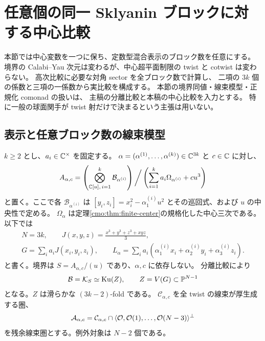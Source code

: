 \section{任意個の同一 Sklyanin ブロックに対する中心比較}
\label{cmm:sec:multiblock-central}

本節では中心変数を一つに保ち、定数型混合表示のブロック数を任意にする。
境界の Calabi--Yau 次元は変わるが、中心超平面制限の twist と cotwist は変わらない。
高次比較に必要な対角 sector を全ブロック数で計算し、
二項の $3k$ 個の係数と三項の一係数から実比較を構成する。
本節の境界同値・線束模型・正規化 comonad の扱いは、
主稿の分離比較と本稿の中心比較を入力とする。
特に一般の球面関手が twist 射だけで決まるという主張は用いない。

\subsection{表示と任意ブロック数の線束模型}

$k\ge2$ とし、$a_i\in\mathbb C^\times$ を固定する。
$\alpha=(\alpha^{(1)},\ldots,\alpha^{(k)})\in\mathbb C^{3k}$ と $c\in\mathbb C$ に対し、
\begin{equation}\label{cmm:eq:family}
 A_{\alpha,c}=
 \left(\bigotimes_{\mathbb C[u],\,i=1}^k\mathcal B_{\alpha^{(i)}}\right)
 \bigg/\left(\sum_{i=1}^k a_i\Omega_{\alpha^{(i)}}+cu^3\right)
\end{equation}
と置く。ここで各 $\mathcal B_{\alpha^{(i)}}$ は
$[y_i,z_i]=x_i^2-\alpha^{(i)}_1u^2$ とその巡回式、および $u$ の中央性で定める。
$\Omega_\alpha$ は定理\ref{cmo:thm:finite-center}の規格化した中心三次である。
以下では
\[
 \begin{gathered}
 N=3k,\qquad
 J(x,y,z)=\frac{x^3+y^3+z^3+xyz}{3},\\
 G=\sum_i a_iJ(x_i,y_i,z_i),\qquad
 L_\alpha=\sum_i a_i(\alpha^{(i)}_1x_i+
                         \alpha^{(i)}_2y_i+\alpha^{(i)}_3z_i).
 \end{gathered}
\]
と書く。境界は $S=A_{\alpha,c}/(u)$ であり、$\alpha,c$ に依存しない。
分離比較により
\[
 \mathcal B=\mathcal K_S\simeq\operatorname{Ku}(Z),\qquad
 Z=V(G)\subset\mathbb P^{N-1}
\]
となる。$Z$ は滑らかな $(3k-2)$-fold である。
$\mathcal C_{\alpha,c}$ を全 twist の線束が厚生成する圏、
\[
 \mathcal A_{\alpha,c}=\mathcal C_{\alpha,c}\cap
 \langle\mathcal O,\mathcal O(1),\ldots,\mathcal O(N-3)\rangle^\perp
\]
を残余線束圏とする。例外対象は $N-2$ 個である。

